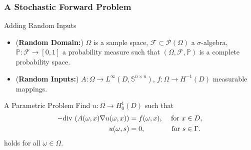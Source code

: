 \documentclass[aspectratio=169,xcolor=dvipsnames,10pt]{beamer}
\newcommand{\bbp}{\mathbb{P}}
\newcommand{\cF}{\mathcal{F}}
\begin{document}
\begin{frame}\frametitle{A Stochastic Forward Problem}
\begin{block}{Adding Random Inputs}
\begin{itemize}
\item (\textbf{Random Domain:}) $\Omega$ is a sample space, $\cF \subset \mathcal{P}(\Omega)$ a $\sigma$-algebra, $\bbp : \cF \to [0,1]$ a probability measure such that $(\Omega, \cF, \bbp)$ is a complete probability space.
\item  (\textbf{Random Inputs:}) $A: \Omega \to L^{\infty}(D, \mathbb S^{n \times n})$, $f: \Omega \to H^{-1}(D)$ measurable mappings.
\end{itemize}
\end{block}\vspace{-1.5mm}

\begin{block}{A Parametric Problem}
Find $u: \Omega \to H^1_0(D)$ such that
\begin{equation}\label{eq:lin_ellip_stoch}
\aligned
-\mathrm{div\,}\left(A(\omega,x) \nabla u(\omega,x) \right) 
&= f(\omega,x), &\text{ for } x  &\in D,\\
u(\omega,s)
&= 0,          &\text{ for } s &\in \Gamma.
\endaligned
\end{equation}
holds for all $\omega \in \Omega$.
\end{block}\vspace{-1.5mm}

\end{frame}
\end{document}
